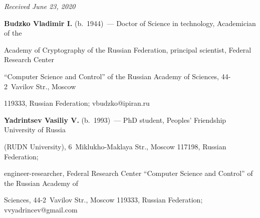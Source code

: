 \vspace*{-6pt}





\hfill{\small\textit{Received June 23, 2020}}










\vspace*{-16pt}








\Contr





\vspace*{-3pt}





\noindent


\textbf{Budzko Vladimir I.} (b.\ 1944)~--- Doctor of Science in technology, Academician of the 


Academy of Cryptography of the Russian Federation, principal scientist, Federal Research Center 


``Computer Science and Control'' of the Russian Academy of Sciences, 44-2~Vavilov Str., Moscow 


119333, Russian Federation; \mbox{vbudzko@ipiran.ru}


     


    \pagebreak


     


     \noindent


     \textbf{Yadrintsev Vasiliy V.} (b.\ 1993)~--- PhD student, Peoples' Friendship University of Russia 


(RUDN University), 6~Miklukho-Maklaya Str., Moscow 117198, Russian Federation; 


engineer-researcher, Federal Research Center ``Computer Science and Control'' of the Russian Academy of 


Sciences, 44-2~Vavilov Str., Moscow 119333, Russian Federation; \mbox{vvyadrincev@gmail.com}


     


     \vspace*{3pt}


